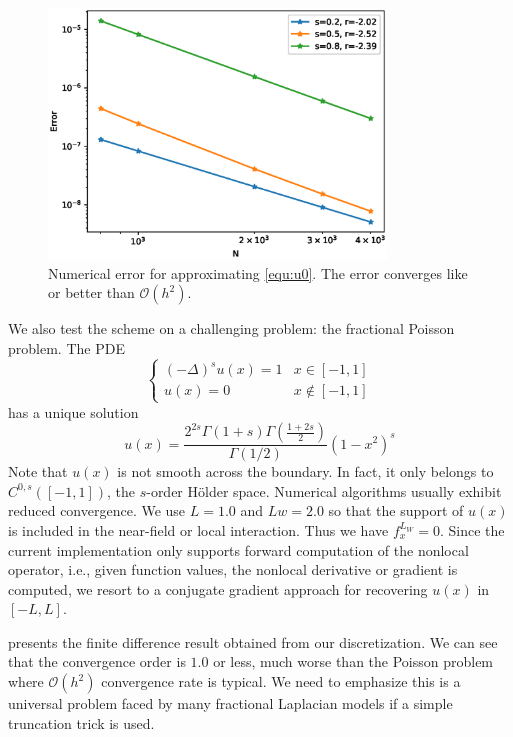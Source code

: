 \documentclass[10pt,a4paper]{article}
\theoremstyle{definition}
\begin{document}
\begin{figure}[H] %
\centering
\includegraphics[width=0.8\textwidth,keepaspectratio]{figures/fig5}
\caption{Numerical error for approximating \cref{equ:u0}. The error converges like or better than $\mathcal{O}(h^2)$.}
\label{fig:fig5}
\end{figure}

We also test the scheme on a challenging problem: the fractional Poisson problem. The PDE
\begin{equation}
	\begin{cases}
		(-\Delta)^s u(x) = 1 & x\in [-1,1]\\
		u(x) = 0 & x\not\in [-1,1]
	\end{cases}
\end{equation}
has a unique solution
\begin{equation}
	u(x) = \frac{2^{2s}\Gamma(1+s)\Gamma\left( \frac{1+2s}{2} \right) }{\Gamma(1/2)} (1-x^2)^s
\end{equation}
Note that $u(x)$ is not smooth across the boundary. In fact, it only belongs to $C^{0,s}([-1,1])$, the $s$-order H\"older space. Numerical algorithms usually exhibit reduced convergence.  We use $L=1.0$ and $Lw=2.0$ so that the support of $u(x)$ is included in the near-field or local interaction. Thus we have $f_x^{L_W}=0$. Since the current implementation only supports forward computation of the nonlocal operator, i.e., given function values, the nonlocal derivative or gradient is computed, we resort to a conjugate gradient approach for recovering $u(x)$ in $[-L,L]$. 

 presents the finite difference result obtained from our discretization. We can see that the convergence order is $1.0$ or less, much worse than the Poisson problem where $\mathcal{O}(h^2)$ convergence rate is typical. We need to emphasize this is a universal problem faced by many fractional Laplacian models if a simple truncation trick is used. 
\end{document}
